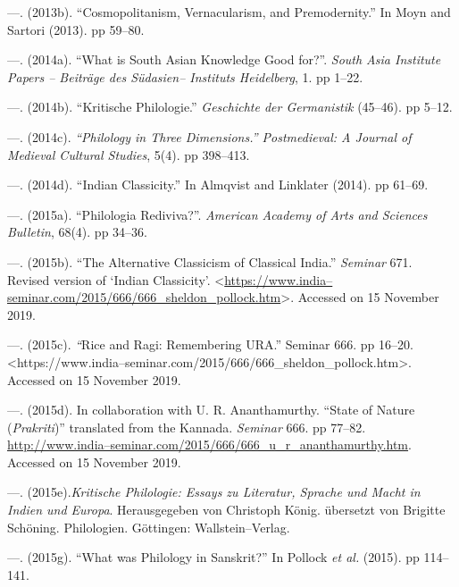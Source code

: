  \item —. (2013b). “Cosmopolitanism, Vernacularism, and Premodernity.” In Moyn and Sartori (2013). pp 59–80.

 \item —. (2014a). “What is South Asian Knowledge Good for?”. \textit{South Asia Institute Papers – Beiträge des Südasien– Instituts Heidelberg}, 1. pp 1–22.

 \item —. (2014b). “Kritische Philologie.” \textit{Geschichte der Germanistik} (45–46). pp 5–12.

 \item —. (2014c).\textit{ “Philology in Three Dimensions.” Postmedieval: A Journal of Medieval Cultural Studies}, 5(4). pp 398–413.

 \item —. (2014d). “Indian Classicity.” In Almqvist and Linklater (2014). pp 61–69.

 \item —. (2015a). “Philologia Rediviva?”. \textit{American Academy of Arts and Sciences Bulletin}, 68(4). pp 34–36.

 \item —. (2015b). “The Alternative Classicism of Classical India.” \textit{Seminar} 671. Revised version of ‘Indian Classicity’. \textless \url{https://www.india–seminar.com/2015/666/666_sheldon_pollock.htm}\textgreater . Accessed on 15 November 2019.

 \item —. (2015c).\textit{ “}Rice and Ragi: Remembering URA.” Seminar 666. pp 16–20. \textless https://www.india–seminar.com/2015/666/666\_sheldon\_pollock.htm\textgreater . Accessed on 15 November 2019.

 \item —. (2015d). In collaboration with U. R. Ananthamurthy. “State of Nature (\textit{Prakriti})” translated from the Kannada. \textit{Seminar} 666. pp 77–82. \url{http://www.india–seminar.com/2015/666/666_u_r_ananthamurthy.htm}. Accessed on 15 November 2019.

 \item —. (2015e).\textit{Kritische Philologie: Essays zu Literatur, Sprache und Macht in Indien und Europa}. Herausgegeben von Christoph König. übersetzt von Brigitte Schöning. Philologien. Göttingen: Wallstein–Verlag.

 \item —. (2015g). “What was Philology in Sanskrit?” In Pollock \textit{et al.} (2015). pp 114–141.

